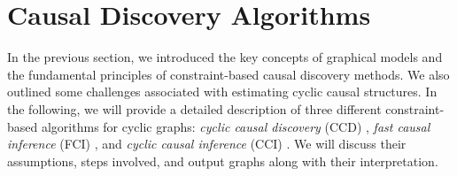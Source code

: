 \documentclass[twoside, 11pt]{article}
\newcommand*{\figref}[2][]{%
  \hyperref[{fig:#2}]{%
    Figure~\ref*{fig:#2}%
    \ifx\\#1\\%
    \else
      #1%
    \fi
  }%
}
\begin{document}







\section{Causal Discovery Algorithms} \label{cdalgo}

In the previous section, we introduced the key concepts of graphical models and the fundamental principles of constraint-based causal discovery methods. We also outlined some challenges associated with estimating cyclic causal structures. In the following, we will provide a detailed description of three different constraint-based algorithms for cyclic graphs: \textit{cyclic causal discovery} (CCD) \citep{Richardson1996a}, \textit{fast causal inference} (FCI) \citep{mooij_classen2020}, and \textit{cyclic causal inference} (CCI) \citep{strobl2019}. We will discuss their assumptions, steps involved, and output graphs along with their interpretation.

\end{document}
